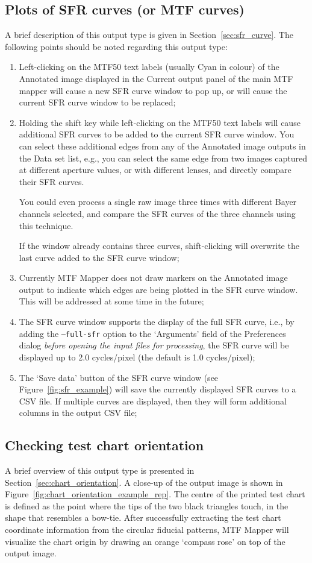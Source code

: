 \documentclass[a4paper]{article}
\begin{document}
\subsection{Plots of SFR curves (or MTF curves)}
A brief description of this output type is given in
Section~\ref{sec:sfr_curve}. The following points should be noted regarding
this output type:
\begin{enumerate}
\item 
Left-clicking on the MTF50 text labels (usually Cyan in colour) of the \textsf{Annotated image}
displayed in the \textsf{Current output} panel of the main MTF mapper will
cause a new SFR curve window to pop up, or will cause the current SFR curve
window to be replaced;
\item
Holding the shift key while left-clicking on the MTF50 text labels will
cause additional SFR curves to be added to the current SFR curve window. You
can select these additional edges from any of the \textsf{Annotated image}
outputs in the Data set list, e.g., you can select the same edge from two
images captured at different aperture values, or with different lenses, and
directly compare their SFR curves.

You could even process a single raw image three times with different Bayer
channels selected, and compare the SFR curves of the three channels 
using this technique.

If the window already contains three curves, shift-clicking will overwrite the
last curve added to the SFR curve window;
\item
Currently MTF Mapper does not draw markers on the \textsf{Annotated image}
output to indicate which edges are being plotted in the SFR curve window.
This will be addressed at some time in the future;
\item
The SFR curve window supports the display of the full SFR curve, i.e., by
adding the \texttt{--full-sfr} option to the `Arguments' field of the
\textsf{Preferences} dialog \emph{before opening the input files for
processing}, the SFR curve will be displayed up to 2.0 cycles/pixel (the
default is 1.0 cycles/pixel);
\item
The `Save data' button of the SFR curve window (see
Figure~\ref{fig:sfr_example}) will save the currently displayed SFR curves
to a CSV file. If multiple curves are displayed, then they will form
additional columns in the output CSV file;
\end{enumerate}

\subsection{Checking test chart orientation}
\label{sec:chart_orientation_details}
A brief overview of this output type is presented in
Section~\ref{sec:chart_orientation}. 
A close-up of the output image is shown in Figure~\ref{fig:chart_orientation_example_rep}.
The centre of the printed test chart is defined as the point where the tips
of the two black triangles touch, in the shape that resembles a bow-tie.
After successfully extracting the test chart coordinate information from the
circular fiducial patterns, MTF Mapper will visualize the chart origin by drawing
an orange `compass rose' on top of the output image.
\end{document}
